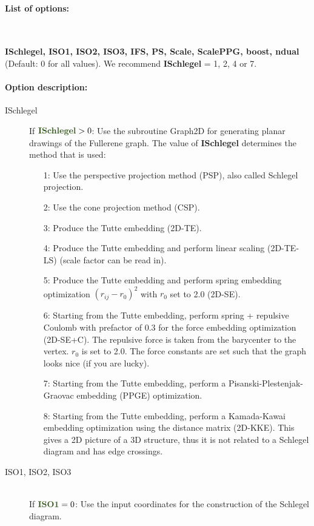 \documentclass[article,a4paper,twoside]{memoir}
\newcommand{\paramname}[1]{{\color{green}\textbf{#1}}}
\begin{document}
\paragraph{List of options:}\ 

 \paramname{ISchlegel, ISO1, ISO2, ISO3, IFS, PS, Scale, ScalePPG, boost, ndual} (Default: 0 for all values). We recommend \paramname{ISchlegel} = 1, 2, 4 or 7.


\paragraph{Option description:}
\begin{description}
\item[ISchlegel] 
If $\paramname{ISchlegel} > 0$: Use the subroutine Graph2D for generating planar drawings of the Fullerene graph.
The value of \paramname{ISchlegel} determines the method that is used:
\begin{enumerate}
\item[1:] Use the perspective projection method (PSP), also called Schlegel projection.
\item[2:] Use the cone projection method (CSP).
\item[3:] Produce the Tutte embedding (2D-TE).
\item[4:] Produce the Tutte embedding and perform linear scaling (2D-TE-LS) (scale factor can be read in).
\item[5:] Produce the Tutte embedding and perform spring embedding optimization $(r_{ij}-r_0)^2$ with $r_0$ set to 2.0 (2D-SE).
\item[6:] Starting from the Tutte embedding, perform spring + repulsive Coulomb with prefactor of 0.3 for the
  force embedding optimization (2D-SE+C). The repulsive force is taken from the barycenter to the vertex. $r_0$ is set to 2.0. The force
  constants are set such that the graph looks nice (if you are lucky).
\item[7:] Starting from the Tutte embedding, perform a Pisanski-Plestenjak-Graovac embedding (PPGE) optimization.
\item[8:] Starting from the Tutte embedding, perform a Kamada-Kawai embedding \cite{kamada89}
optimization using the distance matrix (2D-KKE).  This gives a 2D picture of a 3D structure, thus
it is not related to a Schlegel diagram and has edge crossings.
\end{enumerate}
\item[ISO1, ISO2, ISO3]\ \\
  If $\paramname{ISO1} = 0$: Use the input coordinates for the construction of the Schlegel diagram.\\

\end{description}
\end{document}

